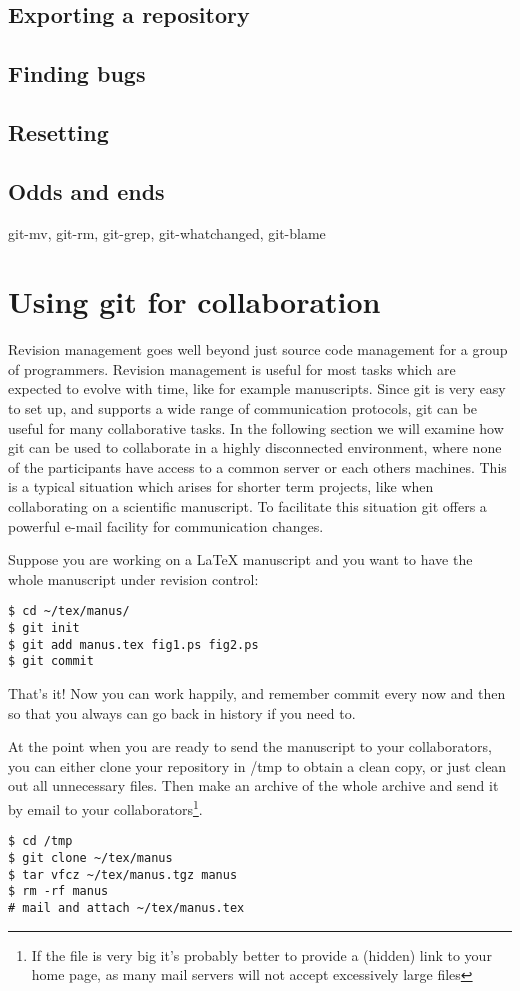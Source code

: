 \documentclass[a4paper,10pt]{article}
\begin{document}
\subsection{Exporting a repository}

\subsection{Finding bugs}

\subsection{Resetting}

\subsection{Odds and ends}
git-mv, git-rm, git-grep, git-whatchanged, git-blame

\section{Using git for collaboration}
Revision management goes well beyond just source code management for a group
of programmers. Revision management is useful for most tasks which are
expected to evolve with time, like for example manuscripts.
Since git is very easy to set up, and supports a wide range of communication
protocols, git can be useful for many collaborative tasks. In the following
section we will examine how git can be used to collaborate in a highly
disconnected environment, where none of the participants have access to a
common server or each others machines. This is a typical situation which
arises for shorter term projects, like when collaborating on a scientific
manuscript. To facilitate this situation git offers a powerful e-mail facility
for communication changes.

Suppose you are working on a LaTeX manuscript and you want to have the whole
manuscript under revision control:
\begin{verbatim}
$ cd ~/tex/manus/
$ git init
$ git add manus.tex fig1.ps fig2.ps
$ git commit
\end{verbatim}
That's it! Now you can work happily, and remember commit every now and then so
that you always can go back in history if you need to. 

At the point when you are ready to send the manuscript to your collaborators,
you can either clone your repository in /tmp to obtain a clean copy, or just
clean out all unnecessary files. Then make an archive of the whole archive and
send it by email to your collaborators\footnote{If the file is very big it's
probably better to provide a (hidden) link to your home page, as many mail
servers will not accept excessively large files}. 
\begin{verbatim}
$ cd /tmp
$ git clone ~/tex/manus
$ tar vfcz ~/tex/manus.tgz manus
$ rm -rf manus
# mail and attach ~/tex/manus.tex
\end{verbatim}
\end{document}
